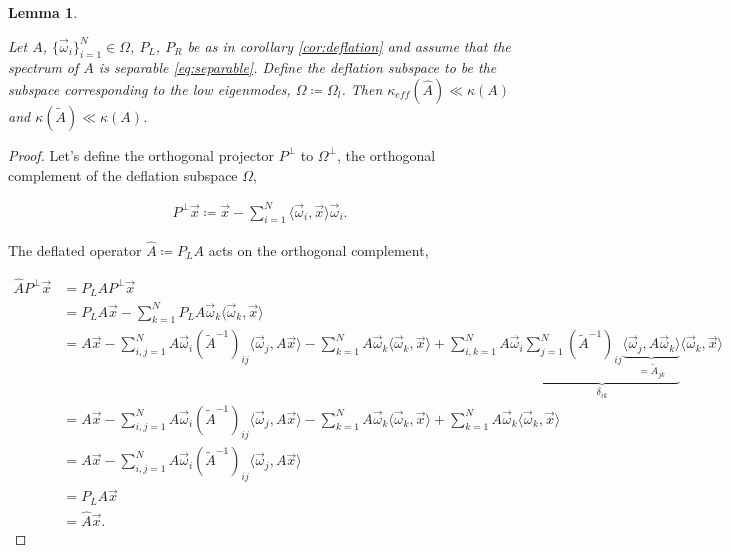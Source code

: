 \documentclass{article}
\theoremstyle{plain} %
\newtheorem{lemma}[theorem]{Lemma}
\theoremstyle{convention} %
\theoremstyle{remark} %
\numberwithin{equation}{section}
\begin{document}
\begin{lemma}
\label{lem:condition_number}

Let $A$, $\{\vec{\omega}_i\}_{i=1}^N \in \Omega$, $P_L$, $P_R$ be as in corollary \ref{cor:deflation} and assume that the spectrum of $A$ is separable \eqref{eq:separable}. Define the deflation subspace to be the subspace corresponding to the low eigenmodes, $\Omega \coloneqq \Omega_l$. Then $\kappa_{eff}(\hat{A}) \ll \kappa(A)$ and $\kappa(\tilde{A}) \ll \kappa(A)$.
\end{lemma}

\begin{proof}

Let's define the orthogonal projector $P^{\perp}$ to $\Omega^{\perp}$, the orthogonal complement of the deflation subspace $\Omega$,

\begin{align*}
    P^{\perp} \vec{x} \coloneqq \vec{x} - \sum_{i=1}^N \langle \vec{\omega}_i, \vec{x} \rangle \vec{\omega}_i.
\end{align*}

The deflated operator $\hat{A} \coloneqq P_L A$ acts on the orthogonal complement,

\begin{align*}
    \hat{A} P^{\perp} \vec{x} &= P_L A P^{\perp} \vec{x} \\
    &= P_L A \vec{x} - \sum_{k=1}^N P_L A \vec{\omega}_k \langle \vec{\omega}_k, \vec{x} \rangle \\
    &= A \vec{x} - \sum_{i,j=1}^N A \vec{\omega}_i (\widetilde{A}^{-1})_{ij} \langle \vec{\omega}_j, A \vec{x} \rangle - \sum_{k=1}^N A \vec{\omega}_k \langle \vec{\omega}_k, \vec{x} \rangle + \sum_{i,k=1}^N A \vec{\omega}_i \underbrace{ \sum_{j=1}^N (\widetilde{A}^{-1})_{ij} \underbrace{\langle \vec{\omega}_j, A \vec{\omega}_k \rangle}_{=\widetilde{A}_{jk}} }_{\delta_{ik}} \langle \vec{\omega}_k, \vec{x} \rangle \\
    &= A \vec{x} - \sum_{i,j=1}^N A \vec{\omega}_i (\widetilde{A}^{-1})_{ij} \langle \vec{\omega}_j, A \vec{x} \rangle - \sum_{k=1}^N A \vec{\omega}_k \langle \vec{\omega}_k, \vec{x} \rangle + \sum_{k=1}^N A \vec{\omega}_k \langle \vec{\omega}_k, \vec{x} \rangle \\
    &= A \vec{x} - \sum_{i,j=1}^N A \vec{\omega}_i (\widetilde{A}^{-1})_{ij} \langle \vec{\omega}_j, A \vec{x} \rangle \\
    &= P_L A \vec{x} \\
    &= \hat{A} \vec{x}.
\end{align*}


\end{proof}
\end{document}
